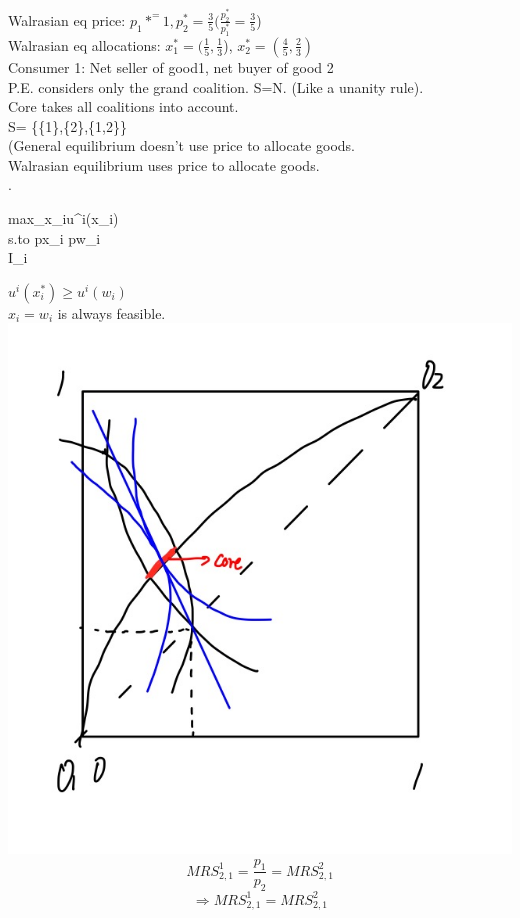 \documentclass[letterpaper,13pt,single,pdftex]{scrartcl}
\newenvironment{rcases}
  {\left.\begin{aligned}}
  {\end{aligned}\right\rbrace}
\begin{document}
Walrasian eq price: $p_1*^ =1, p_2^*=\frac{3}{5}(\frac{p_2^*}{p_1^*} = \frac{3}{5}$)\\
Walrasian eq allocations: $x_1^* = (\frac{1}{5},\frac{1}{3}$), $x_2^*=(\frac{4}{5},\frac{2}{3})$\\
Consumer 1: Net seller of good1, net buyer of good 2\\
P.E. considers only the grand coalition. S=N. (Like a unanity rule).\\
Core takes all coalitions into account. \\
S= \{\{1\},\{2\},\{1,2\}\}\\
(General equilibrium doesn't use price to allocate goods.\\
Walrasian equilibrium uses price to allocate goods. \\
\begin{rcases}
    max_{x_i}\quad u^i(x_i)\\
    s.to \quad p\bullet x_i \le p\bullet w_i\\
    \qquad \qquad I_i
\end{rcases}
$u^i(x_i^*)\ge u^i(w_i)$\\
$x_i = w_i$ is always feasible. \\
\includegraphics[scale = 0.2]{WEA-2.jpg}
\[MRS_{2,1}^1=\frac{p_1}{p_2} = MRS_{2,1}^2\]
\[\Rightarrow MRS_{2,1}^1 = MRS_{2,1}^2\]
\end{document}
